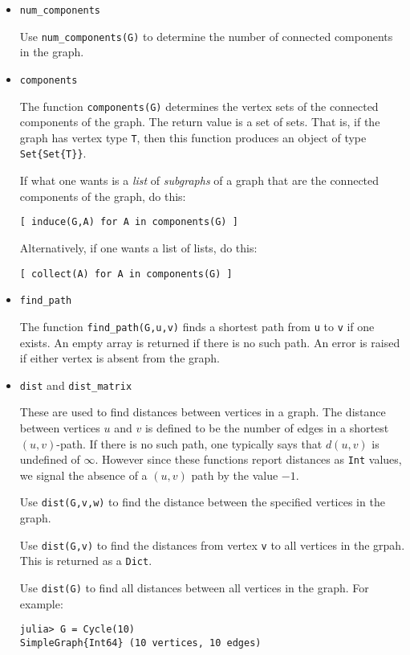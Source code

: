 \documentclass[oneside]{amsart}
\begin{document}
\begin{itemize}
\item \verb|num_components|

  Use \verb|num_components(G)| to determine the number of connected
  components in the graph.

\item \verb|components|

  The function \verb|components(G)| determines the vertex sets of the
  connected components of the graph. The return value is a set of
  sets. That is, if the graph has vertex type \verb|T|, then this
  function produces an object of type \verb|Set{Set{T}}|.

  If what one wants is a \emph{list} of \emph{subgraphs} of a graph
  that are the connected components of the graph, do this:
\begin{verbatim}
[ induce(G,A) for A in components(G) ]
\end{verbatim}

  Alternatively, if one wants a list of lists, do this:
\begin{verbatim}
[ collect(A) for A in components(G) ]
\end{verbatim}


\item \verb|find_path|

  The function \verb|find_path(G,u,v)| finds a shortest path from
  \verb|u| to \verb|v| if one exists. An empty array is returned if
  there is no such path. An error is raised if either vertex is absent
  from the graph.

\item \verb|dist| and \verb|dist_matrix|

  These are used to find distances between vertices in a graph. The
  distance between vertices $u$ and $v$ is defined to be the number of
  edges in a shortest $(u,v)$-path. If there is no such path, one
  typically says that $d(u,v)$ is undefined of $\infty$. However since
  these functions report distances as \verb|Int| values, we signal the
  absence of a $(u,v)$ path by the value $-1$.

  Use \verb|dist(G,v,w)| to find the distance between the specified
  vertices in the graph.

  Use \verb|dist(G,v)| to find the distances from vertex \verb|v| to
  all vertices in the grpah. This is returned as a \verb|Dict|.

  Use \verb|dist(G)| to find all distances between all vertices in the
  graph. For example:
  {\small
\begin{verbatim}
julia> G = Cycle(10)
SimpleGraph{Int64} (10 vertices, 10 edges)


\end{verbatim}}
\end{itemize}
\end{document}
